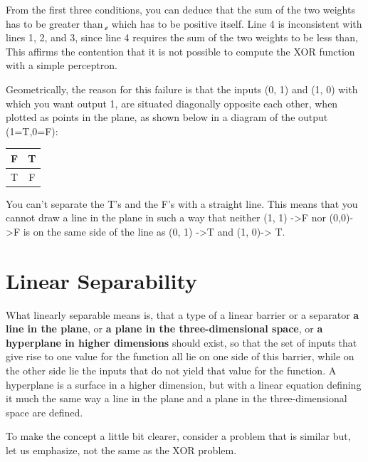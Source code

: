From the first three conditions, you can deduce that the sum of the two weights has to be greater than  ̧, which has to be positive itself. Line 4 is inconsistent with lines 1, 2, and 3, since line 4 requires the sum of the two weights to be less than, This affirms the contention that it is not possible to compute the XOR function with a simple perceptron.

Geometrically, the reason for this failure is that the inputs (0, 1) and (1, 0) with which you want output 1, are situated diagonally opposite each other, when plotted as points in the plane, as shown below in a diagram of the output (1=T,0=F): \\

\begin{tabular}{|c|c|}
\hline
F & T \\ \hline
T & F \\ \hline
\end{tabular}

You can’t separate the T’s and the F’s with a straight line. This means that you cannot draw a line in the plane in such a way that neither (1, 1) ->F nor (0,0)->F is on the same side of the line as (0, 1) ->T and (1, 0)-> T.

\section{Linear Separability}
What linearly separable means is, that a type of a linear barrier or a
separator \textbf{a line in the plane}, or \textbf{a plane in the three-dimensional space}, or \textbf{a hyperplane in higher dimensions} should exist, so that the set of inputs that give rise to one value for the function all lie on one side of this barrier, while on the other side lie the inputs that do not yield that value for the function. A hyperplane is a surface in a higher dimension, but with a linear equation defining it much the same way a line in the plane and a plane in the three-dimensional space are defined.

To make the concept a little bit clearer, consider a problem that is similar but, let us emphasize, not the same as the XOR problem.

